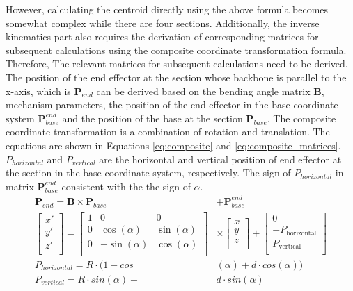 However, calculating the centroid directly using the above formula becomes somewhat complex while there are four sections. 
Additionally, the inverse kinematics part also requires the derivation of corresponding matrices for subsequent calculations 
using the composite coordinate transformation formula. Therefore, The relevant matrices for subsequent calculations need to 
be derived. 
The position of the end effector at the section whose backbone is parallel to the x-axis, which is $\textbf{P}_{end}$ can be 
derived based on the bending angle matrix $\textbf{B}$, mechanism parameters, the position of the end effector in the base 
coordinate system $\textbf{P}_{base}^{end}$ and the position of the base at the section $\textbf{P}_{base}$. The composite 
coordinate transformation is a combination of rotation and translation. The equations are shown in Equations \ref{eq:composite} 
and \ref{eq:composite_matrices}. $P_{horizontal}$ and $P_{vertical}$ are the horizontal and vertical position of end effector 
at the section in the base coordinate system, respectively. The sign of $P_{horizontal}$ in matrix $\textbf{P}_{base}^{end}$ 
consistent with the the sign of $\alpha$.
\begin{align}
    \textbf{P}_{end} = \textbf{B} \times \textbf{P}_{base} &+ \textbf{P}_{base}^{end} \label{eq:composite} \\
    \begin{bmatrix}
        x' \\
        y' \\
        z' \\
    \end{bmatrix}
    =
    \begin{bmatrix}
        1 & 0 & 0 \\
        0 & \cos(\alpha) & \sin(\alpha) \\
        0 & -\sin(\alpha) & \cos(\alpha) \\
    \end{bmatrix}
    &\times
    \begin{bmatrix}
        x \\
        y \\
        z \\
    \end{bmatrix}
    +
    \begin{bmatrix}
        0 \\
        \pm P_{\text{horizontal}} \\
        P_{\text{vertical}} \\
    \end{bmatrix}\label{eq:composite_matrices} \\
    P_{horizontal} = R\cdot(1-cos&(\alpha) + d\cdot cos(\alpha)) \nonumber \\ 
    P_{vertical} = R\cdot sin(\alpha) + &d\cdot sin(\alpha) \nonumber
\end{align}
